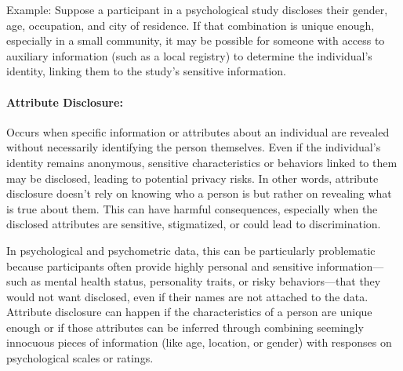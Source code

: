 \documentclass{article}
\begin{document}
Example:
Suppose a participant in a psychological study discloses their gender, age, occupation, and city of residence. If that combination is unique enough, especially in a small community, it may be possible for someone with access to auxiliary information (such as a local registry) to determine the individual’s identity, linking them to the study’s sensitive information.


\paragraph{Attribute Disclosure:} 
\color{blue}
Occurs when specific information or attributes about an individual are revealed without necessarily identifying the person themselves. Even if the individual’s identity remains anonymous, sensitive characteristics or behaviors linked to them may be disclosed, leading to potential privacy risks. In other words, attribute disclosure doesn’t rely on knowing who a person is but rather on revealing what is true about them. This can have harmful consequences, especially when the disclosed attributes are sensitive, stigmatized, or could lead to discrimination.

In psychological and psychometric data, this can be particularly problematic because participants often provide highly personal and sensitive information—such as mental health status, personality traits, or risky behaviors—that they would not want disclosed, even if their names are not attached to the data. Attribute disclosure can happen if the characteristics of a person are unique enough or if those attributes can be inferred through combining seemingly innocuous pieces of information (like age, location, or gender) with responses on psychological scales or ratings.
\end{document}
